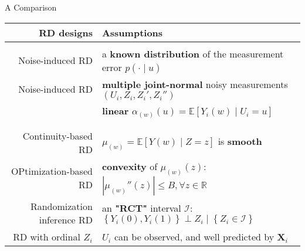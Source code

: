 \begin{frame}{A Comparison}
    \begin{table}[h!]
    \small
    \begin{center}
        \label{tab:summary}
        \begin{tabular}{rl}
        
        RD designs & Assumptions\\
        \hline
        & \\
        Noise-induced RD & a \textcolor{mygreen}{\textbf{known distribution}} of the measurement error $p(\cdot\mid u)$\\
        Noise-induced RD {\footnotesize\citep{rokkanen2015exam}} & \textcolor{mygreen}{\textbf{multiple joint-normal}} noisy measurements $(U_i,Z_i,Z_i',Z_i'')$\\
        & \textcolor{mygreen}{\textbf{linear}} $\alpha_{(w)}(u) = \mathbb{E}\left[ Y_i(w)\mid U_i=u\right]$ \\
        & \\
        \hline
        & \\
        Continuity-based RD & $\mu_{(w)}=\mathbb{E}\left[Y(w)\mid Z=z\right]$ is \textcolor{mygreen}{\textbf{smooth}}\\
        OPtimization-based RD & \textcolor{mygreen}{\textbf{convexity}} of $\mu_{(w)}(z)$: $ \left\vert \mu_{(w)}''(z) \right\vert \leq B, \forall z\in\mathbb{R}$ \\
        Randomization inference RD & an \textcolor{mygreen}{\textbf{"RCT"}} interval $\mathcal{I}$: $\left\{ Y_{i}\left(0\right),Y_{i}\left(1\right)\right\} \perp Z_i \mid \left\{ Z_{i}\in\mathcal{I}\right\}$ \\
        RD with ordinal $Z_i$ & $U_i$ can be observed, and well predicted by $\mathbf{X}_i$
        \end{tabular}
    \end{center}
    \end{table}
\end{frame}